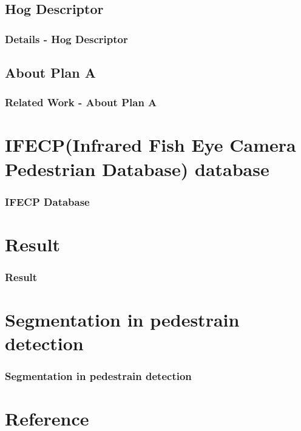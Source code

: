 \documentclass{beamer}
\begin{document}
\subsection{Hog Descriptor}
\begin{frame}
\frametitle{Details - Hog Descriptor}
\end{frame}



\subsection{About Plan A}
\begin{frame}
\frametitle{Related Work - About Plan A}
\end{frame}





\section{IFECP(Infrared Fish Eye Camera Pedestrian Database) database}
\begin{frame}
\frametitle{IFECP Database}
\end{frame}





\section{Result}
\begin{frame}
\frametitle{Result}
\end{frame}





\section{Segmentation in pedestrain detection}
\begin{frame}
\frametitle{Segmentation in pedestrain detection}
\end{frame}




\section{Reference}
\begin{frame}


\end{frame}
\end{document}
